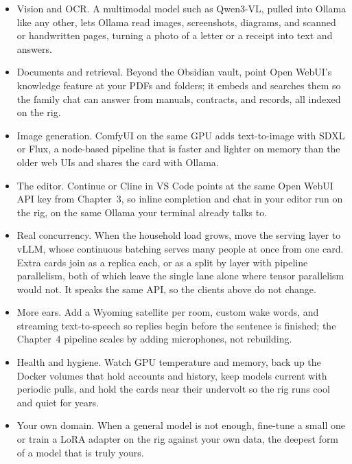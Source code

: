 \begin{itemize}
    \item Vision and OCR. A multimodal model such as Qwen3-VL, pulled into Ollama
    like any other, lets Ollama read images, screenshots, diagrams, and scanned
    or handwritten pages, turning a photo of a letter or a receipt into text and
    answers\cite{ollamaVision}.

    \item Documents and retrieval. Beyond the Obsidian vault, point Open WebUI's
    knowledge feature at your PDFs and folders; it embeds and searches them so the
    family chat can answer from manuals, contracts, and records, all indexed on the
    rig\cite{openwebuiRAG}.

    \item Image generation. ComfyUI on the same GPU adds text-to-image with SDXL or
    Flux, a node-based pipeline that is faster and lighter on memory than the
    older web UIs and shares the card with Ollama\cite{comfyuiRepo}.

    \item The editor. Continue or Cline in VS Code points at the same Open WebUI API
    key from Chapter~3, so inline completion and chat in your editor run on the rig,
    on the same Ollama your terminal already talks to.

    \item Real concurrency. When the household load grows, move the serving layer to
    vLLM, whose continuous batching serves many people at once from one
    card. Extra cards join as a replica each, or as a split by layer with pipeline
    parallelism, both of which leave the single lane alone where tensor
    parallelism would not. It speaks the same API, so the clients above do not
    change\cite{vllmParallelism}.

    \item More ears. Add a Wyoming satellite per room, custom wake words, and
    streaming text-to-speech so replies begin before the sentence is finished; the
    Chapter~4 pipeline scales by adding microphones, not rebuilding.

    \item Health and hygiene. Watch GPU temperature and memory, back up the Docker
    volumes that hold accounts and history, keep models current with periodic pulls,
    and hold the cards near their undervolt so the rig runs cool and quiet for years.

    \item Your own domain. When a general model is not enough, fine-tune a small one
    or train a LoRA adapter on the rig against your own data, the deepest form of a
    model that is truly yours.
\end{itemize}

